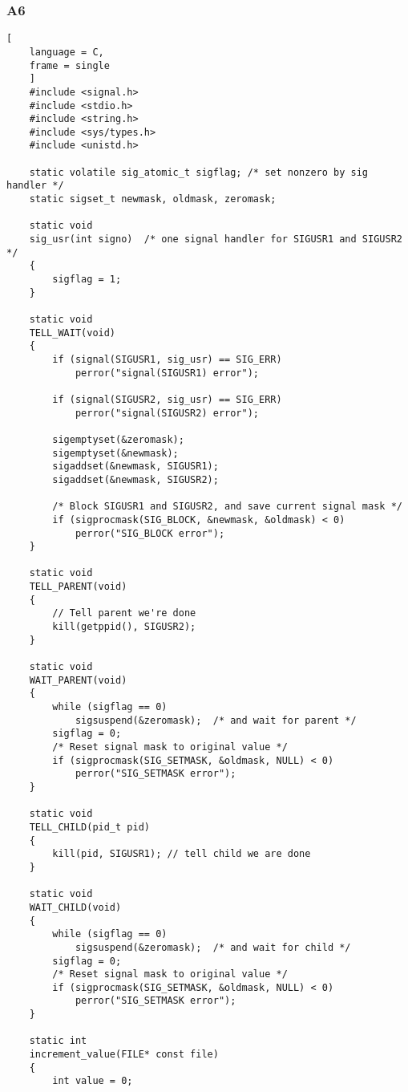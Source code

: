 \documentclass{article}
\begin{document}
\subsubsection{A6\label{a6}}
\begin{lstlisting}[
    language = C,
    frame = single
    ]
    #include <signal.h>
    #include <stdio.h>
    #include <string.h>
    #include <sys/types.h>
    #include <unistd.h>

    static volatile sig_atomic_t sigflag; /* set nonzero by sig handler */
    static sigset_t newmask, oldmask, zeromask;

    static void
    sig_usr(int signo)  /* one signal handler for SIGUSR1 and SIGUSR2 */
    {
        sigflag = 1;
    }

    static void
    TELL_WAIT(void)
    {
        if (signal(SIGUSR1, sig_usr) == SIG_ERR)
            perror("signal(SIGUSR1) error");

        if (signal(SIGUSR2, sig_usr) == SIG_ERR)
            perror("signal(SIGUSR2) error");

        sigemptyset(&zeromask);
        sigemptyset(&newmask);
        sigaddset(&newmask, SIGUSR1);
        sigaddset(&newmask, SIGUSR2);

        /* Block SIGUSR1 and SIGUSR2, and save current signal mask */
        if (sigprocmask(SIG_BLOCK, &newmask, &oldmask) < 0)
            perror("SIG_BLOCK error");
    }

    static void
    TELL_PARENT(void)
    {
        // Tell parent we're done
        kill(getppid(), SIGUSR2);
    }

    static void
    WAIT_PARENT(void)
    {
        while (sigflag == 0)
            sigsuspend(&zeromask);  /* and wait for parent */
        sigflag = 0;
        /* Reset signal mask to original value */
        if (sigprocmask(SIG_SETMASK, &oldmask, NULL) < 0)
            perror("SIG_SETMASK error");
    }

    static void
    TELL_CHILD(pid_t pid)
    {
        kill(pid, SIGUSR1); // tell child we are done
    }

    static void
    WAIT_CHILD(void)
    {
        while (sigflag == 0)
            sigsuspend(&zeromask);  /* and wait for child */
        sigflag = 0;
        /* Reset signal mask to original value */
        if (sigprocmask(SIG_SETMASK, &oldmask, NULL) < 0)
            perror("SIG_SETMASK error");
    }

    static int
    increment_value(FILE* const file)
    {
        int value = 0;


\end{lstlisting}
\end{document}
